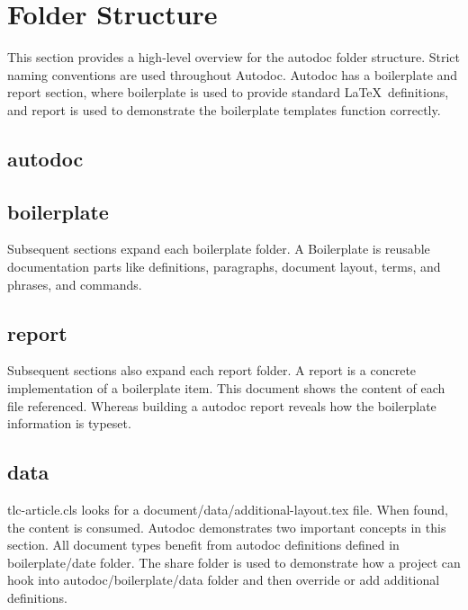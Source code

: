 
\clearpage
\section{Folder Structure} 
This section provides a high-level overview for the autodoc folder structure.
Strict naming conventions are used throughout Autodoc.  Autodoc has
a boilerplate and report section, where boilerplate is used to provide standard
\LaTeX\ definitions, and report is used to demonstrate the boilerplate templates
function correctly. 

\tlcVspace

\subsection{autodoc}
%

\subsection{boilerplate}
Subsequent sections expand each boilerplate folder.  A Boilerplate is reusable
documentation parts like definitions, paragraphs, document layout, terms, and
phrases, and commands. 

\tlcVspace

%

\subsection{report}
Subsequent sections also expand each report folder.  A report is a concrete
implementation of a boilerplate item.  This document shows the content of each
file referenced.  Whereas building a autodoc report reveals how the boilerplate
information is typeset. 

\tlcVspace


\clearpage
\subsection{data}
tlc-article.cls looks for a document/data/additional-layout.tex file.  When
found, the content is consumed.  Autodoc demonstrates two important concepts in
this section.  All document types benefit from autodoc definitions defined in
boilerplate/date folder.  The share folder is used to demonstrate how a project
can hook into autodoc/boilerplate/data folder and then override or add
additional definitions. 

\tlcVspace

%

